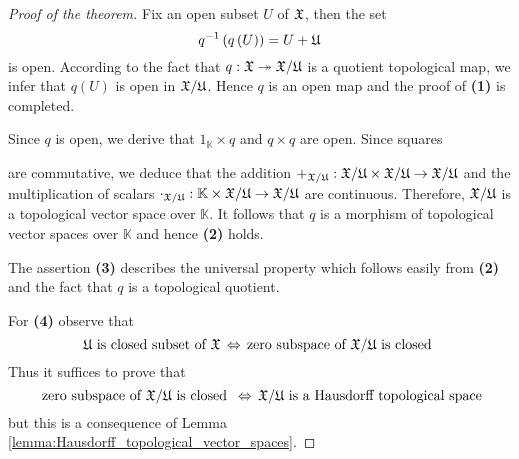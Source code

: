 \begin{proof}[Proof of the theorem]
Fix an open subset $U$ of ${\mathfrak X}$, then the set 
$$q^{-1}\left(q\left(U\right)\right) = U + {\mathfrak U}$$
is open. According to the fact that $q:{\mathfrak X}\twoheadrightarrow {\mathfrak X}/{\mathfrak U}$ is a quotient topological map, we infer that $q(U)$ is open in ${\mathfrak X}/{\mathfrak U}$. Hence $q$ is an open map and the proof of \textbf{(1)} is completed.

Since $q$ is open, we derive that $1_{\mathbb{K}}\times q$ and $q\times q$ are open. Since squares
\begin{center}
\end{center}
are commutative, we deduce that the addition $+_{{\mathfrak X}/{\mathfrak U}}:{\mathfrak X}/{\mathfrak U} \times {\mathfrak X}/{\mathfrak U} \rightarrow {\mathfrak X}/{\mathfrak U}$ and the multiplication of scalars $\cdot_{{\mathfrak X}/{\mathfrak U}}:\mathbb{K}\times {\mathfrak X}/{\mathfrak U}\rightarrow {\mathfrak X}/{\mathfrak U}$ are continuous. Therefore, ${\mathfrak X}/{\mathfrak U}$ is a topological vector space over $\mathbb{K}$. It follows that $q$ is a morphism of topological vector spaces over $\mathbb{K}$ and hence \textbf{(2)} holds.

The assertion \textbf{(3)} describes the universal property which follows easily from \textbf{(2)} and the fact that $q$ is a topological quotient.

For \textbf{(4)} observe that
$${\mathfrak U}\mbox{ is closed subset of }{\mathfrak X}\,\Leftrightarrow\,\mbox{zero subspace of }{\mathfrak X}/{\mathfrak U}\mbox{ is closed }$$
Thus it suffices to prove that
$$\mbox{ zero subspace of }{\mathfrak X}/{\mathfrak U}\mbox{ is closed }\,\Leftrightarrow\,{\mathfrak X}/{\mathfrak U}\mbox{ is a Hausdorff topological space}$$
but this is a consequence of Lemma \ref{lemma:Hausdorff_topological_vector_spaces}.    
\end{proof}

